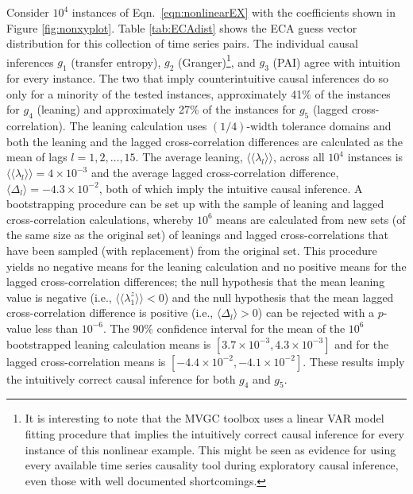 Consider $10^4$ instances of Eqn.\ \ref{eqn:nonlinearEX} with the coefficients shown in Figure \ref{fig:nonxyplot}.  Table \ref{tab:ECAdist} shows the ECA guess vector distribution for this collection of time series pairs.  The individual causal inferences $g_1$ (transfer entropy), $g_2$ (Granger)\footnote{It is interesting to note that the MVGC toolbox uses a linear VAR model fitting procedure that implies the intuitively correct causal inference for every instance of this nonlinear example.  This might be seen as evidence for using every available time series causality tool during exploratory causal inference, even those with well documented shortcomings.}, and $g_3$ (PAI) agree with intuition for every instance.  The two that imply counterintuitive causal inferences do so only for a minority of the tested instances, approximately 41\% of the instances for $g_4$ (leaning) and approximately 27\% of the instances for $g_5$ (lagged cross-correlation).  The leaning calculation uses $(1/4)$-width tolerance domains and both the leaning and the lagged cross-correlation differences are calculated as the mean of lags $l=1,2,\ldots,15$.  The average leaning, $\langle\langle\lambda_l\rangle\rangle$, across all $10^4$ instances is $\langle\langle\lambda_l\rangle\rangle = 4\times 10^{-3}$ and the average lagged cross-correlation difference, $\langle\Delta_l\rangle=-4.3\times 10^{-2}$, both of which imply the intuitive causal inference.  A bootstrapping \cite{Efron1994} procedure can be set up with the sample of leaning and lagged cross-correlation calculations, whereby $10^6$ means are calculated from new sets (of the same size as the original set) of leanings and lagged cross-correlations that have been sampled (with replacement) from the original set.  This procedure yields no negative means for the leaning calculation and no positive means for the lagged cross-correlation differences; the null hypothesis that the mean leaning value is negative (i.e., $\langle\langle\lambda_1^z\rangle\rangle < 0$) and the null hypothesis that the mean lagged cross-correlation difference is positive (i.e., $\langle\Delta_l\rangle > 0$) can be rejected with a $p$-value less than $10^{-6}$.  The $90\%$ confidence interval for the mean of the $10^6$ bootstrapped leaning calculation means is $[3.7\times 10^{-3},4.3\times 10^{-3}]$ and for the lagged cross-correlation means is $[-4.4\times 10^{-2},-4.1\times 10^{-2}]$.  These results imply the intuitively correct causal inference for both $g_4$ and $g_5$.
